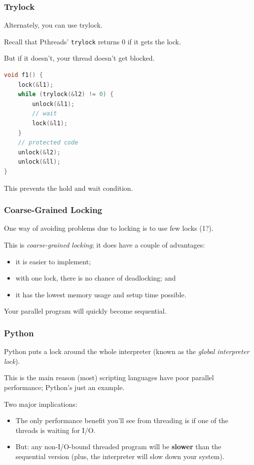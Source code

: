 \begin{frame}[fragile]
\frametitle{Trylock}

Alternately, you can use trylock. 

Recall that Pthreads' {\tt trylock} returns 0 if it gets the lock. 

But if it doesn't, your thread doesn't get blocked. 

\begin{lstlisting}[language=C]
void f1() {
    lock(&l1);
    while (trylock(&l2) != 0) {
        unlock(&l1);
        // wait
        lock(&l1);
    }
    // protected code
    unlock(&l2);
    unlock(&ll);    
}
\end{lstlisting}

This prevents the hold and wait condition.

\end{frame}


\begin{frame}
\frametitle{Coarse-Grained Locking}

One way of avoiding problems due to locking is to use few locks
(1?). 

This is \emph{coarse-grained locking}; it does have a couple of advantages:
  \begin{itemize}
    \item it is easier to implement;
    \item with one lock, there is no chance of deadlocking; and
    \item it has the lowest memory usage and setup time possible.
  \end{itemize}

Your parallel program will quickly become sequential.


\end{frame}

\begin{frame}
\frametitle{Python}

Python puts a lock around the whole interpreter (known as the
\emph{global interpreter lock}).  

This is the main reason (most) scripting languages have poor parallel performance; Python's just an example.

Two major implications:
\begin{itemize}
\item The only performance benefit you'll see from threading is if one of the threads is
      waiting for I/O.
\item But: any non-I/O-bound threaded program will be {\bf slower} than the sequential
      version (plus, the interpreter will slow down your system).
\end{itemize}


\end{frame}

